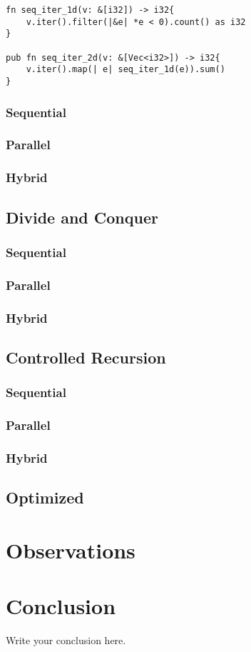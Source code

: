 \documentclass{article}
\begin{document}
\begin{lstlisting}[caption = Iterative]
fn seq_iter_1d(v: &[i32]) -> i32{
    v.iter().filter(|&e| *e < 0).count() as i32
}

pub fn seq_iter_2d(v: &[Vec<i32>]) -> i32{
    v.iter().map(| e| seq_iter_1d(e)).sum()
}

\end{lstlisting}

\subsubsection{Sequential}

\subsubsection{Parallel}

\subsubsection{Hybrid}

\subsection{Divide and Conquer}

\subsubsection{Sequential}

\subsubsection{Parallel}

\subsubsection{Hybrid}

\subsection{Controlled Recursion}

\subsubsection{Sequential}

\subsubsection{Parallel}

\subsubsection{Hybrid}

\subsection{Optimized}

\section{Observations}

\section{Conclusion}
Write your conclusion here.

\nocite{*}
\end{document}
